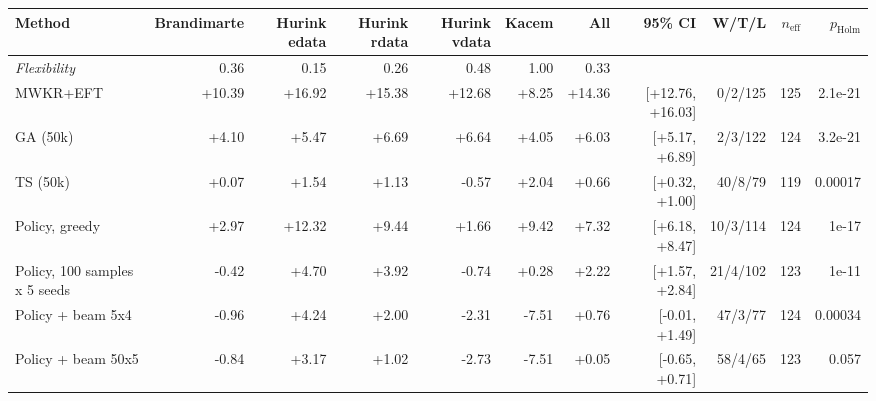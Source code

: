 \begin{tabular}{lrrrrrrrrrr}
\toprule
Method & Brandimarte & Hurink edata & Hurink rdata & Hurink vdata & Kacem & All & 95\% CI & W/T/L & $n_{\mathrm{eff}}$ & $p_{\mathrm{Holm}}$ \\
\midrule
\emph{Flexibility} & 0.36 & 0.15 & 0.26 & 0.48 & 1.00 & 0.33 & & & & \\
\midrule
MWKR+EFT & +10.39 & +16.92 & +15.38 & +12.68 & +8.25 & +14.36 & [+12.76, +16.03] & 0/2/125 & 125 & 2.1e-21 \\
GA (50k) & +4.10 & +5.47 & +6.69 & +6.64 & +4.05 & +6.03 & [+5.17, +6.89] & 2/3/122 & 124 & 3.2e-21 \\
TS (50k) & +0.07 & +1.54 & +1.13 & -0.57 & +2.04 & +0.66 & [+0.32, +1.00] & 40/8/79 & 119 & 0.00017 \\
Policy, greedy & +2.97 & +12.32 & +9.44 & +1.66 & +9.42 & +7.32 & [+6.18, +8.47] & 10/3/114 & 124 & 1e-17 \\
Policy, 100 samples x 5 seeds & -0.42 & +4.70 & +3.92 & -0.74 & +0.28 & +2.22 & [+1.57, +2.84] & 21/4/102 & 123 & 1e-11 \\
Policy + beam 5x4 & -0.96 & +4.24 & +2.00 & -2.31 & -7.51 & +0.76 & [-0.01, +1.49] & 47/3/77 & 124 & 0.00034 \\
Policy + beam 50x5 & -0.84 & +3.17 & +1.02 & -2.73 & -7.51 & +0.05 & [-0.65, +0.71] & 58/4/65 & 123 & 0.057 \\
\bottomrule
\end{tabular}
